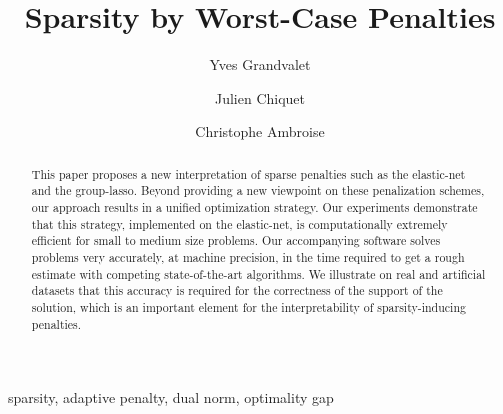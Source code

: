 \documentclass[review,authoryear]{elsarticle}
\begin{document}
\begin{frontmatter}





\title{Sparsity by Worst-Case Penalties}

\author[label1]{Yves Grandvalet}
\author[label2]{Julien Chiquet}
\author[label3]{Christophe Ambroise}
\address[label1]{Sorbonne universit\'es, Universit\'e de technologie de Compi\`egne, CNRS, \\ Heudiasyc UMR 7253, CS 60 319, 60 203 Compi\`egne cedex, France}
\address[label2]{AgroParisTech, INRA, Universit\'e Paris-Saclay\\UMR MIA-Paris, 16 rue Claude Bernard, 75005, Paris, France}
\address[label3]{Universit\'e d'\'Evry Val d'Essonne, Universit\'e Paris-Saclay,  ENSIIE, USC INRA\\ UMR CNRS 8071, LaMME, 91000 \'Evry, France}

\begin{abstract}%
  This paper proposes a new interpretation of sparse penalties such as
  the elastic-net and the group-lasso.  Beyond providing a new
  viewpoint on these penalization schemes, our approach results in a
  unified optimization strategy.  Our experiments demonstrate that
  this strategy, implemented on the elastic-net, is computationally
  extremely efficient for small to medium size problems.  Our
  accompanying software solves problems very accurately, at machine
  precision, in the time required to get a rough estimate with
  competing state-of-the-art algorithms.  We illustrate on real and
  artificial datasets that this accuracy is required for the
  correctness of the support of the solution, which is an important
  element for the interpretability of sparsity-inducing penalties.
\end{abstract} 

\begin{keyword}
  sparsity, adaptive penalty, dual norm, optimality gap
\end{keyword}

\end{frontmatter}











 



\appendix


\end{document}
